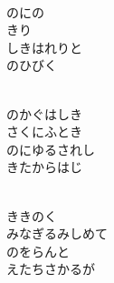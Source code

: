 \documentclass[10pt,b5j]{tarticle} %
\begin{document}
\vspace{1.5em} %
\newcommand{\linespace}{0.5em} %
\newcommand{\blocksize}{0.5\hsize} %
\newcommand{\itemmargin}{3em} %
\begin{enumerate} %
    \setlength{\itemindent}{\itemmargin} %
    \begin{minipage}[c]{\blocksize}
    
        \vspace{\linespace}
        \item~\\
        のにの\\
        きり\\
        しきはれりと\\
        のひびく
        
    \end{minipage}
    \begin{minipage}[c]{\blocksize}
        
        \vspace{\linespace}
        \item~\\
        のかぐはしき\\
        さくにふとき\\
        のにゆるされし\\
        きたからはじ
        
    \end{minipage}
    \begin{minipage}[c]{\blocksize}
        
        \vspace{\linespace}
        \item~\\
        ききのく\\
        みなぎるみしめて\\
        のをらんと\\
        えたちさかるが
        

\end{minipage}
\end{enumerate}
\end{document}
